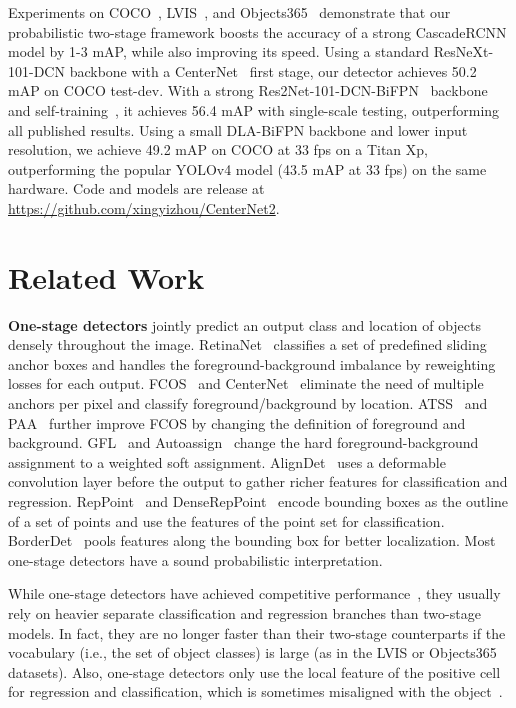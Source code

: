 \documentclass{article}
\begin{document}
Experiments on COCO~\cite{lin2014coco}, LVIS~\cite{gupta2019lvis}, and Objects365~\cite{shao2019objects365} demonstrate that our probabilistic two-stage framework boosts the accuracy of a strong CascadeRCNN model by 1-3 mAP, while also improving its speed.
Using a standard ResNeXt-101-DCN backbone with a CenterNet~\cite{zhou2019objects} first stage, our detector achieves 50.2 mAP on COCO test-dev.
With a strong Res2Net-101-DCN-BiFPN~\cite{gao2019res2net,tan2020efficientdet} backbone and self-training~\cite{zoph2020rethinking}, it achieves 56.4 mAP with single-scale testing, outperforming all published results.
Using a small DLA-BiFPN backbone and lower input resolution, we achieve 49.2 mAP on COCO at 33 fps on a Titan Xp, outperforming the popular YOLOv4 model (43.5 mAP at 33 fps) on the same hardware.
Code and models are release at \url{https://github.com/xingyizhou/CenterNet2}.


\section{Related Work}

\noindent \textbf{One-stage detectors} jointly predict an output class and location of objects densely throughout the image.
RetinaNet~\cite{lin2018focal} classifies a set of predefined sliding anchor boxes and handles the foreground-background imbalance by reweighting losses for each output.
FCOS~\cite{tian2019fcos} and CenterNet~\cite{zhou2019objects} eliminate the need of multiple anchors per pixel and classify foreground/background by location.
ATSS~\cite{zhang2020bridging} and PAA~\cite{paa-eccv2020} further improve FCOS by changing the definition of foreground and background.
GFL~\cite{li2020generalized} and Autoassign~\cite{zhu2020autoassign} change the hard foreground-background assignment to a weighted soft assignment.
AlignDet~\cite{chen2019revisiting} uses a deformable convolution layer before the output to gather richer features for classification and regression.
RepPoint~\cite{yang2019reppoints} and DenseRepPoint~\cite{yang2019dense} encode bounding boxes as the outline of a set of points and use the features of the point set for classification.
BorderDet~\cite{qiu2020borderdet} pools features along the bounding box for better localization.
Most one-stage detectors have a sound probabilistic interpretation.

While one-stage detectors have achieved competitive performance~\cite{zhang2020bridging,paa-eccv2020,zhang2019freeanchor,li2020generalized,zhu2020autoassign}, they usually rely on heavier separate classification and regression branches than two-stage models.
In fact, they are no longer faster than their two-stage counterparts if the vocabulary (i.e., the set of object classes) is large (as in the LVIS or Objects365 datasets).
Also, one-stage detectors only use the local feature of the positive cell for regression and classification, which is sometimes misaligned with the object~\cite{chen2019revisiting,song2020revisiting}.
\end{document}
